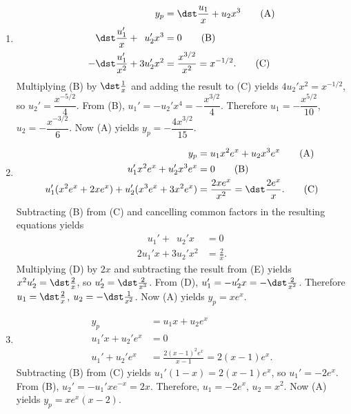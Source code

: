 \documentclass[openany]{book}
\newenvironment{sectionSolutions}{
 \begin{enumerate}[item-label={\thesection.\arabic{enumi}.}]
}{
 \end{enumerate}
}
\begin{document}
\begin{sectionSolutions}
\item
\begin{align*}
y_p&=\dst\frac{u_1}{ x}+u_2x^3\tag{A}\\
\phantom{-}\dst\frac{u_1'}{x}+\phantom{3}u_2'x^3&=0\tag{B}\\
-\dst\frac{u_1'}{ x^2}+3u_2'x^2&=\frac{x^{3/2}}{x^2}=x^{-1/2}. \tag{C}
\end{align*}
Multiplying (B) by $\dst\frac{1}{ x}$ and
adding the result to (C) yields
$4u_2'x^2=x^{-1/2}$, so $u_2'=\dfrac{x^{-5/2}}{4}$. From
(B), $u_1'=-u_2'x^4=-\dfrac{x^{3/2}}{4}$.
Therefore $u_1=-\dfrac{x^{5/2}}{10}$, $u_2=-\dfrac{x^{-3/2}}{6}$.
Now (A) yields $y_p=-\dfrac{4x^{3/2}}{15}$.


\item
\begin{align*}
y_p&=u_1x^2e^x+u_2x^3e^x\tag{A}\\
u_1'x^2e^x+u_2'x^3e^x&=0\tag{B}\\
u_1'(x^2e^x+2xe^x)+u_2'(x^3e^x+3x^2e^x)&=\frac{2xe^x}{
x^2}=\dst\frac{2e^x}{ x}.\tag{C}
\end{align*}
Subtracting (B) from (C)
and cancelling common factors in the resulting equations
yields
\begin{align*}
\phantom{2x}u_1'+\phantom{3}u_2'x&=0\tag{D}\\
2u_1'x+3u_2'x^2&=\frac{2}{ x}.\tag{E}
\end{align*}
Multiplying (D) by $2x$ and subtracting the result
from (E) yields $x^2u_2'=\dst\frac{2}{ x}$, so
$u_2'=\dst\frac{2}{ x^3}$. From (D),
$u_1'=-u_2'x=-\dst\frac{2}{ x^2}$. Therefore $u_1=\dst\frac{2}{ x}$,
$u_2=-\dst\frac{1}{ x^2}$. Now (A) yields $y_p=xe^x$.


\item
\begin{align*}
y_p&=u_1x+u_2e^x\tag{A}\\
u_1'x+u_2'e^x&=0\tag{B}\\
u_1'+u_2'e^x&=\frac{2(x-1)^2e^x}{x-1}=2(x-1)e^x.\tag{C}
\end{align*}
Subtracting (B) from (C)
yields $u_1'(1-x)=2(x-1)e^x$, so $u_1'=-2e^x$. From
(B), $u_2'=-u_1'xe^{-x}=2x$. Therefore,
$u_1=-2e^x$, $u_2=x^2$. Now (A) yields $y_p=xe^x(x-2)$.




\end{sectionSolutions}
\end{document}
